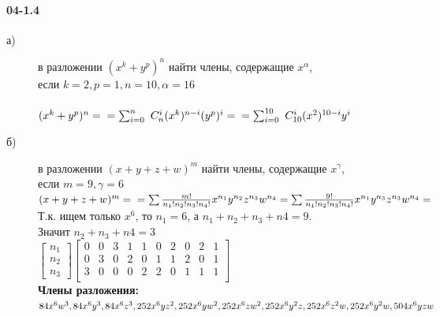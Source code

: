 \documentclass[12pt]{article}
\begin{document}
	\paragraph{04-1.4}\begin{description}
		\item[а)] в разложении \ensuremath{(x ^k + y ^p) ^n} найти члены, содержащие \ensuremath{ x ^\alpha }, \\
			если
			\ensuremath{k = 2, p = 1, n = 10, \alpha = 16} \\
			\\
			\ensuremath{
				(x ^k + y ^p) ^n = \\\\
				= \sum_{i = 0}^{n} \ C_{n}^{i} (x ^k) ^{n - i} (y ^p)^i = \\\\
				= \sum_{i = 0}^{10} \ C_{10}^{i} (x ^2) ^{10 - i} y^i \\\\
			}
		\item[б)] в разложении \ensuremath{(x + y + z + w) ^m} найти члены, содержащие \ensuremath{ x ^\gamma }, \\
			если
			\ensuremath{m = 9, \gamma = 6}
			\\
			\ensuremath{
				(x + y + z + w) ^m = \\\\
				= \sum \frac{ m! }{ n_1 ! n_2 ! n_3 ! n_4 ! } x ^{n_1} y ^{n_2} z ^{n_3} w ^{n_4} = 
				  \sum \frac{ 9! }{ n_1 ! n_2 ! n_3 ! n_4 ! } x ^{n_1} y ^{n_3} z ^{n_3} w ^{n_4} = \\\\
			}
			Т.к. ищем только \ensuremath{ x^6 }, то \ensuremath{ n_1 = 6 }, а \ensuremath{ n_1 + n_2 + n_3 + n4 = 9 }. \\
			Значит \ensuremath{ n_2 + n_3 + n4 = 3 } \\
			\ensuremath{
				\begin{bmatrix}
				n_1 \\ n_2 \\ n_3
				\end{bmatrix}
				\begin{bmatrix}
				0 & 0 & 3 & 1 & 1 & 0 & 2 & 0 & 2 & 1 \\
				0 & 3 & 0 & 2 & 0 & 1 & 1 & 2 & 0 & 1 \\
				3 & 0 & 0 & 0 & 2 & 2 & 0 & 1 & 1 & 1 \\
				\end{bmatrix}
			}
			\\
			{\bf
			Члены разложения:
				\ensuremath{
					84x^6w^3, 84x^6y^3, 84x^6z^3, \\
					252x^6yz^2, 252x^6yw^2,	252x^6zw^2, \\ 
					252x^6y^2z, 252x^6z^2w, 252x^6y^2w, 504x^6yzw
				}
			}
	\end{description}
\end{document}
